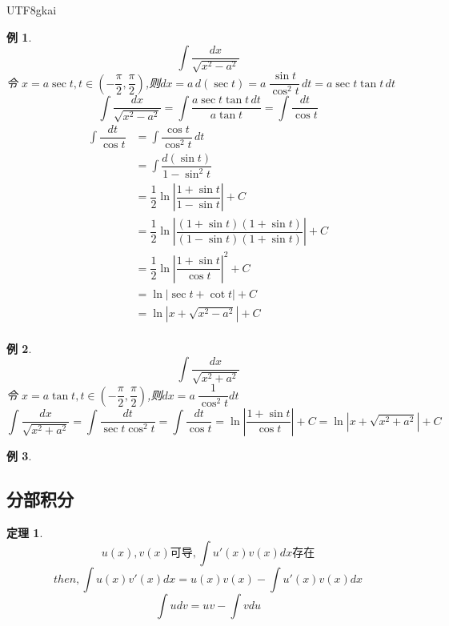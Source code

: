 \documentclass{article}
\newtheorem{theorem}{定理}[subsection]
\newtheorem{example}{例}[subsection]
\begin{document}
\begin{CJK}{UTF8}{gkai}
\begin{example}
  \[\int \dfrac{dx}{\sqrt{x^2 - a^2}}\]
  令 $x = a\sec t, t\in(-\dfrac{\pi}{2},\dfrac{\pi}{2})$,则$dx = a \,d(\sec t) = a~ \dfrac{\sin t}{\cos^2 t}\, dt = a \sec t \tan t \, dt$
  \[\int \dfrac{dx}{\sqrt{x^2 - a^2}} =\int \dfrac{a\sec t \tan t \, dt}{a \tan t} = \int \dfrac{dt}{\cos t}\]
  \[
  \begin{aligned}  
  \int \dfrac{dt}{\cos t} &= \int \dfrac{\cos t}{\cos^2 t}\, dt \\
  &= \int \dfrac{d(\sin t)}{1- \sin^2 t} \\
  &=\dfrac{1}{2}\ln \left| \dfrac{1 + \sin t}{1 - \sin t}\right| + C\\ 
  &=\dfrac{1}{2}\ln \left| \dfrac{(1 + \sin t)(1 + \sin t)}{(1 - \sin t)(1 + \sin t)}\right| + C\\ 
  &=\dfrac{1}{2}\ln \left| \dfrac{1 + \sin t}{\cos t}\right|^2 + C\\ 
  &=\ln \left|\sec t + \cot t \right| + C\\ 
  &= \ln| x + \sqrt{x^2 - a^2}| + C\\
  \end{aligned}
  \]
\end{example}

\begin{example}
  \[\int \dfrac{dx}{\sqrt{x^2 + a^2}}\]
  令 $x = a\tan t, t\in(-\dfrac{\pi}{2},\dfrac{\pi}{2})$,则$dx = a ~\dfrac{1}{\cos^2 t}dt$
  \[\int \dfrac{dx}{\sqrt{x^2 + a^2}} =\int \dfrac{dt}{\sec t \cos ^2 t }= \int \dfrac{dt}{\cos t} = \ln \left| \dfrac{1 + \sin t}{\cos t}\right| + C = \ln\left| x + \sqrt{x^2 + a^2}\right| + C\]
\end{example}

\begin{example}
  
\end{example}

\subsection{分部积分}

\begin{theorem}
  \[u(x),v(x)\text{可导},\int u'(x)v(x) dx\text{存在}\]
  \[then,\int u(x)v'(x) dx= u(x)v(x) - \int u'(x) v(x)dx\]
  \[\int u dv = uv- \int v du\]
\end{theorem}


\end{CJK}
\end{document}
